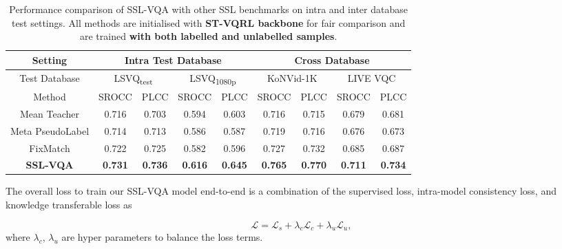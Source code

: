 \documentclass[10pt,twocolumn,letterpaper]{article}
\begin{document}
\begin{table}
\centering
\begin{tabular}{c|cccc|cccc}
\hline
\multicolumn{1}{c|}{Setting} & \multicolumn{4}{c|}{Intra Test Database}                              & \multicolumn{4}{c}{Cross Database}                               \\ \hline 
\multicolumn{1}{c|}{Test Database} & \multicolumn{2}{c|}{LSVQ\textsubscript{test}}  & \multicolumn{2}{c|}{LSVQ\textsubscript{1080p}} & \multicolumn{2}{c|}{KoNVid-1K}    & \multicolumn{2}{c}{LIVE VQC} \\ \hline 
Method                & SROCC & \multicolumn{1}{c|}{PLCC} & SROCC  & PLCC        & SROCC & \multicolumn{1}{c|}{PLCC} & SROCC         & PLCC         \\ \hline
Mean Teacher                    & 0.716 & \multicolumn{1}{c|}{0.703}& 0.594  & 0.603       & 0.716 & \multicolumn{1}{c|}{0.715}&  0.679        & 0.681             \\
Meta PseudoLabel                   & 0.714 & \multicolumn{1}{c|}{0.713}& 0.586  & 0.587       & 0.719 & \multicolumn{1}{c|}{0.716}&  0.676        &  0.673            \\
FixMatch                   & 0.722 & \multicolumn{1}{c|}{0.725}& 0.582  & 0.596       & 0.727 & \multicolumn{1}{c|}{0.732}& 0.685         & 0.687             \\ \hline
\textbf{SSL-VQA}                   & \textbf{0.731} & \multicolumn{1}{c|}{\textbf{0.736}}&  \textbf{0.616} & \textbf{0.645}       & \textbf{0.765} & \multicolumn{1}{c|}{\textbf{0.770}} &  \textbf{0.711}  & \textbf{0.734}      \\ \hline
\end{tabular}
\caption{Performance comparison of SSL-VQA with other SSL benchmarks on intra and inter database test settings. All methods are initialised with \textbf{ST-VQRL backbone} for fair comparison and are trained \textbf{with both labelled and unlabelled samples}.} 
\label{semisupervised_table}
\end{table}

The overall loss to train our SSL-VQA model end-to-end is a combination of the supervised loss, intra-model consistency loss, and knowledge transferable loss as

\begin{equation}
    \mathcal{L} = \mathcal{L}_s + \lambda_c  \mathcal{L}_c + \lambda_u \mathcal{L}_u,
    \label{overall_loss}
\end{equation}
where $\lambda_c$, $\lambda_u$ are hyper parameters to balance the loss terms.
\end{document}
